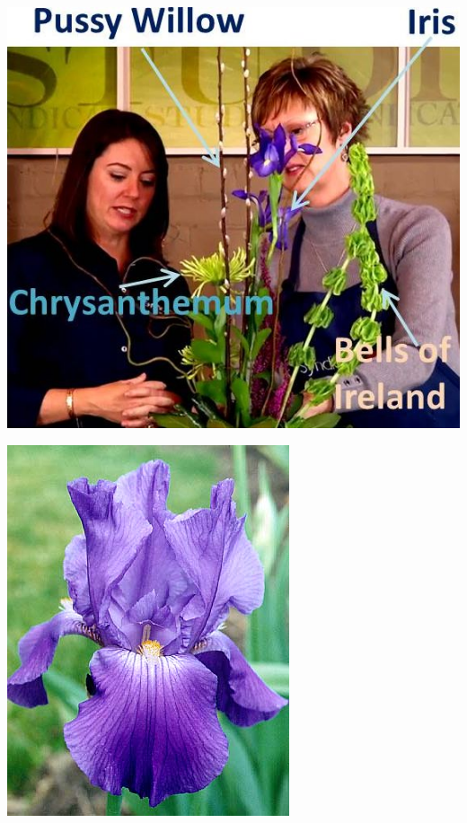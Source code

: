 \documentclass{article}
\begin{document}
\begin{center}
\includegraphics[height=0.9\textheight, angle=90]{../Iris-PussyWillow-Mum_BellsIreland.jpg}
\end{center}
\newpage

\begin{center}
\includegraphics[height=0.9\textheight, angle=90]{../Iris_Chivalry.jpg}
\end{center}
\newpage
\end{document}
